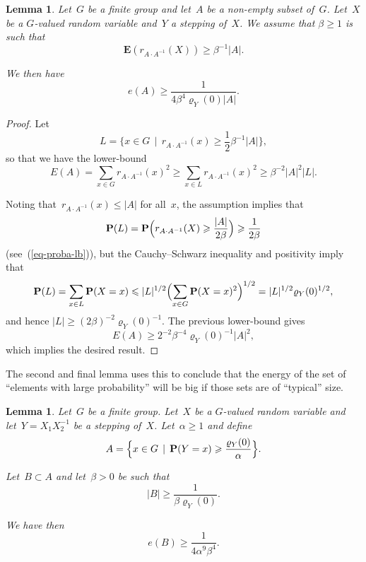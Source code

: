 \documentclass[12pt]{amsart}
\renewcommand{\leq}{\leqslant}
\renewcommand{\geq}{\geqslant}
\numberwithin{equation}{section}
\newcommand{\proba}{\mathbf{P}}
\newcommand{\expect}{\mathbf{E}}
\renewcommand{\rho}{\varrho}
\newcommand{\demi}{{\textstyle{\frac{1}{2}}}}
\theoremstyle{plain}
\newtheorem{lemma}[theorem]{Lemma}
\theoremstyle{remark}
\theoremstyle{definition}
\renewcommand{\geq}{\geqslant}
\renewcommand{\leq}{\leqslant}
\begin{document}
\begin{lemma}\label{lm-random-energy}
  Let~$G$ be a finite group and let~$A$ be a non-empty subset
  of~$G$. Let~$X$ be a $G$-valued random variable and~$Y$ a stepping
  of~$X$. We assume that $\beta\geq 1$ is such that
  $$
  \expect(r_{A\cdot A^{-1}}(X))\geq  \beta^{-1} |A|.
  $$
  
  We then have
  $$
  e(A)\geq \frac{1}{4\beta^{4}\rho_Y(0)|A|}.
  $$
\end{lemma}

\begin{proof}
  Let
  $$
  L=\{x\in G\,\mid\, r_{A\cdot A^{-1}}(x)\geq \demi \beta^{-1}|A|\},
  $$
  so that we have the lower-bound
  $$
  E(A)=\sum_{x\in G}r_{A\cdot A^{-1}}(x)^2\geq \sum_{x\in L}r_{A\cdot
    A^{-1}}(x)^2\geq \beta^{-2}|A|^2|L|.
  $$

  Noting that~$r_{A\cdot A^{-1}}(x)\leq |A|$ for all~$x$, the assumption
  implies that
  $$
  \proba(L)=\proba\Bigl(r_{A\cdot A^{-1}}(X)\geq
  \frac{|A|}{2\beta}\Bigr) \geq \frac{1}{2\beta}
  $$
  (see~(\ref{eq-proba-lb})), but the Cauchy--Schwarz inequality and
  positivity imply that
  $$
  \proba(L)=\sum_{x\in L}\proba(X=x)\leq |L|^{1/2}\Bigl(\sum_{x\in
    G}\proba(X=x)^2\Bigr)^{1/2}=|L|^{1/2}\rho_Y(0)^{1/2},
  $$
  and hence $|L|\geq (2\beta)^{-2}\rho_Y(0)^{-1}$. The previous lower-bound
  gives
  $$
  E(A)\geq 2^{-2}\beta^{-4}\rho_Y(0)^{-1}|A|^2,
  $$
  which implies the desired result.
\end{proof}

The second and final lemma uses this to conclude that the energy of the set
of ``elements with large probability'' will be big if those sets are of
``typical'' size.

\begin{lemma}\label{lm-stepping}
  Let~$G$ be a finite group. Let~$X$ be a $G$-valued random variable and
  let~$Y=X_1X_2^{-1}$ be a stepping of~$X$.  Let~$\alpha\geq 1$ and
  define
  $$
  A=\Bigl\{x\in G\,\mid\, \proba(Y=x)\geq
  \frac{\rho_Y(0)}{\alpha}\Bigr\}.
  $$

  Let~$B\subset A$ and let~$\beta>0$ be such that
  $$
  |B|\geq \frac{1}{\beta\rho_Y(0)}.
  $$

  We have then
  $$
  e(B)\geq \frac{1}{4\alpha^9\beta^4}.
  $$
\end{lemma}
\end{document}
